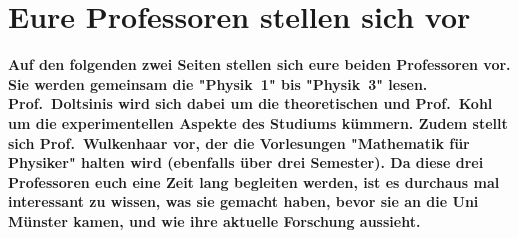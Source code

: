\section[Eure Profs stellen sich vor]{Eure Professoren stellen sich vor}
\textbf{Auf den folgenden zwei Seiten stellen sich eure beiden Professoren vor.
    Sie werden gemeinsam die "Physik~1" bis "Physik~3" lesen.
    Prof.\ Doltsinis wird sich dabei um die theoretischen und Prof.\ Kohl um die experimentellen Aspekte des Studiums kümmern.
    Zudem stellt sich Prof.\ Wulkenhaar vor, der die Vorlesungen "Mathematik für Physiker" halten wird (ebenfalls über drei Semester).
	Da diese drei Professoren euch eine Zeit lang begleiten werden, ist es durchaus mal interessant zu wissen, was sie gemacht haben, bevor sie an die Uni Münster kamen, und wie ihre aktuelle Forschung aussieht.}

